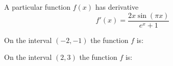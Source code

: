 \documentclass{ximera}
\begin{document}
\begin{exercise}
	
	A particular function $f(x)$ has derivative
	\[ f'(x) = \frac{2x\sin(\pi x)}{e^x+1}\]

	On the interval $(-2, -1)$ the function $f$ is: 
	\begin{exercise}
		On the interval $(2,3)$ the function $f$ is:
	\end{exercise}
\end{exercise}
\end{document}
